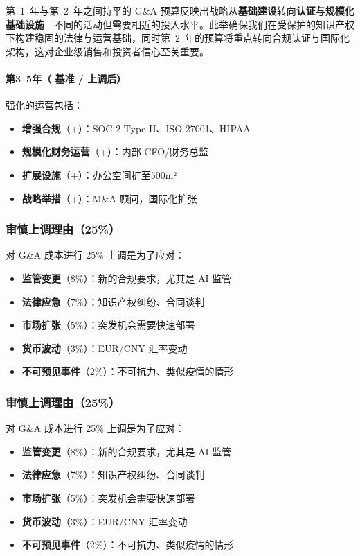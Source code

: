 \documentclass[11pt, a4paper, oneside]{article}
\begin{document}
第~1~年与第~2~年之间持平的 G\&A 预算反映出战略从\textbf{基础建设}转向\textbf{认证与规模化基础设施}---不同的活动但需要相近的投入水平。此举确保我们在受保护的知识产权下构建稳固的法律与运营基础，同时第~2~年的预算将重点转向合规认证与国际化架构，这对企业级销售和投资者信心至关重要。

\paragraph{第3--5年（ 基准 /  上调后）}
强化的运营包括：
\begin{itemize}
    \item \textbf{增强合规}（+）：SOC 2 Type II、ISO 27001、HIPAA
    \item \textbf{规模化财务运营}（+）：内部 CFO/财务总监
    \item \textbf{扩展设施}（+）：办公空间扩至500m²
    \item \textbf{战略举措}（+）：M\&A 顾问，国际化扩张
\end{itemize}

\subsubsection{审慎上调理由（25\%）}
对 G\&A 成本进行 25\% 上调是为了应对：
\begin{itemize}
    \item \textbf{监管变更}（8\%）：新的合规要求，尤其是 AI 监管
    \item \textbf{法律应急}（7\%）：知识产权纠纷、合同谈判
    \item \textbf{市场扩张}（5\%）：突发机会需要快速部署
    \item \textbf{货币波动}（3\%）：EUR/CNY 汇率变动
    \item \textbf{不可预见事件}（2\%）：不可抗力、类似疫情的情形
\end{itemize}
\subsubsection{审慎上调理由（25\%）}
对 G\&A 成本进行 25\% 上调是为了应对：
\begin{itemize}
    \item \textbf{监管变更}（8\%）：新的合规要求，尤其是 AI 监管
    \item \textbf{法律应急}（7\%）：知识产权纠纷、合同谈判
    \item \textbf{市场扩张}（5\%）：突发机会需要快速部署
    \item \textbf{货币波动}（3\%）：EUR/CNY 汇率变动
    \item \textbf{不可预见事件}（2\%）：不可抗力、类似疫情的情形
\end{itemize}
\end{document}
